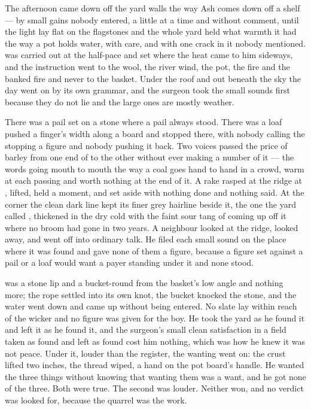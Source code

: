 The afternoon came down off the yard walls the way Ash comes down off a shelf --- by small gains nobody entered, a little at a time and without comment, until the light lay flat on the flagstones and the whole yard held what warmth it had the way a pot holds water, with care, and with one crack in it nobody mentioned.  was carried out at the half-pace and set where the heat came to him sideways, and the instruction went to the wool, the river wind, the pot, the fire and the banked fire and never to the basket. Under the roof and out beneath the sky the day went on by its own grammar, and the surgeon took the small sounds first because they do not lie and the large ones are mostly weather.

There was a pail set on a stone where a pail always stood. There was a loaf pushed a finger's width along a board and stopped there, with nobody calling the stopping a figure and nobody pushing it back. Two voices passed the price of barley from one end of  to the other without ever making a number of it --- the words going mouth to mouth the way a coal goes hand to hand in a crowd, warm at each passing and worth nothing at the end of it. A rake rasped at the ridge at , lifted, held a moment, and set aside with nothing done and nothing said. At the corner the clean dark line kept its finer grey hairline beside it, the one the yard called , thickened in the dry cold with the faint sour tang of  coming up off it where no broom had gone in two years. A neighbour looked at the ridge, looked away, and went off into ordinary talk. He filed each small sound on the place where it was found and gave none of them a figure, because a figure set against a pail or a loaf would want a payer standing under it and none stood.

 was a stone lip and a bucket-round from the basket's low angle and nothing more; the rope settled into its own knot, the bucket knocked the stone, and the water went down and came up without being entered. No slate lay within reach of the wicker and no figure was given for the boy. He took the yard as he found it and left it as he found it, and the surgeon's small clean satisfaction in a field taken as found and left as found cost him nothing, which was how he knew it was not peace. Under it, louder than the register, the wanting went on: the crust lifted two inches, the thread wiped, a hand on the pot board's handle. He wanted the three things without knowing that wanting them was a want, and he got none of the three. Both were true. The second was louder. Neither won, and no verdict was looked for, because the quarrel was the work.

